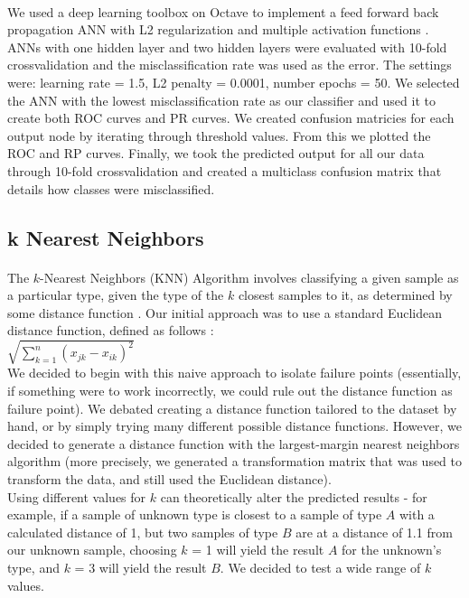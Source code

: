 \documentclass[11pt]{article}
\begin{document}
\paragraph{}
We used a deep learning toolbox on Octave to implement a feed forward back propagation ANN with L2 regularization and multiple activation functions \cite{rbp12}.  ANNs with one hidden layer and two hidden layers were evaluated with 10-fold crossvalidation and the misclassification rate was used as the error. The settings were: learning rate = 1.5, L2 penalty = 0.0001, number epochs = 50. We selected the ANN with the lowest misclassification rate as our classifier and used it to create both ROC curves and PR curves.  We created confusion matricies for each output node by iterating through threshold values.  From this we plotted the ROC and RP curves.  Finally, we took the predicted output for all our data through 10-fold crossvalidation and created a multiclass confusion matrix that details how classes were misclassified.

\subsection{k Nearest Neighbors}
\paragraph{}
    The $k$-Nearest Neighbors (KNN) Algorithm involves classifying a given sample as a particular type, given the type of the $k$ closest samples to it, as determined by some distance function \cite{matlabpage}. Our initial approach was to use a standard Euclidean distance function, defined as follows \cite{sayad} :
    \\
    $\sqrt{\sum\limits_{k = 1}^n (x_{jk} - x_{ik})^2}$
    \\
    We decided to begin with this naive approach to isolate failure points (essentially, if something were to work incorrectly, we could rule out the distance function as failure point).
    We debated creating a distance function tailored to the dataset by hand, or by simply trying many different possible distance functions. However, we decided to generate a distance function with the largest-margin nearest neighbors algorithm (more precisely, we generated a transformation matrix that was used to transform the data, and still used the Euclidean distance).
    \\
    Using different values for $k$ can theoretically alter the predicted results - for example, if a sample of unknown type is closest to a sample of type $A$ with a calculated distance of 1, but two samples of type $B$ are at a distance of 1.1 from our unknown sample, choosing $k$ = 1 will yield the result $A$ for the unknown's type, and $k$ = 3 will yield the result $B$. We decided to test a wide range of $k$ values.
     
\end{document}

